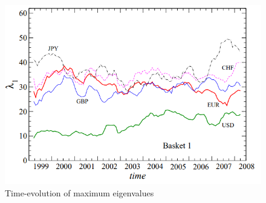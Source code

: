 \documentclass[a4paper]{article}
\begin{document}
\begin{multicols}{2}
\begin{figure}[H]
\centering
    \includegraphics[totalheight=5cm]{EigenvalueTemporal.PNG}
    \caption{Time-evolution of maximum eigenvalues}	
    \label{fig:timefx}
\end{figure}


\end{multicols}
\end{document}
